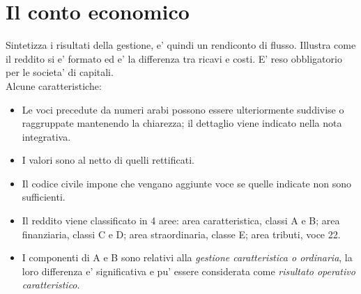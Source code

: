 \documentclass{report}
\begin{document}
	\section{Il conto economico}
	Sintetizza i risultati della gestione, e' quindi un rendiconto di flusso. Illustra come il reddito si e' formato ed e' la differenza tra ricavi e costi. E' reso obbligatorio per le societa' di capitali.
	\medskip \\Alcune caratteristiche:
	\begin{itemize}
		\item Le voci precedute da numeri arabi possono essere ulteriormente suddivise o raggruppate mantenendo la chiarezza; il dettaglio viene indicato nella nota integrativa.
		\item I valori sono al netto di quelli rettificati.
		\item Il codice civile impone che vengano aggiunte voce se quelle indicate non sono sufficienti.
		\item Il reddito viene classificato in 4 aree: area caratteristica, classi A e B; area finanziaria, classi C e D; area straordinaria, classe E; area tributi, voce 22.
		\item I componenti di A e B sono relativi alla \textit{gestione caratteristica o ordinaria}, la loro differenza e' significativa e pu' essere considerata come \textit{risultato operativo caratteristico}.
	\end{itemize}
\end{document}
